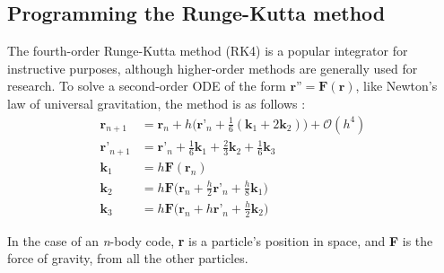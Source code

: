 \documentclass{article}
\begin{document}
\subsection{Programming the Runge-Kutta method}

The fourth-order Runge-Kutta method (RK4) is a popular integrator for instructive purposes, although higher-order methods are generally used for research. To solve a second-order ODE of the form $\textbf{r''} = \textbf{F}(\textbf{r})$, like Newton's law of universal gravitation, the method is as follows \cite{olver1965handbook}:
\begin{align}
  \textbf{r}_{n+1} &= \textbf{r}_n + h\bigg(\textbf{r'}_n + \frac{1}{6}(\textbf{k}_1 + 2\textbf{k}_2)\bigg) + \mathcal{O}(h^4) \\
  \textbf{r'}_{n+1} &= \textbf{r'}_n + \frac{1}{6}\textbf{k}_1 + \frac{2}{3}\textbf{k}_2 + \frac{1}{6}\textbf{k}_3 \\
  \textbf{k}_1 &= h\textbf{F}(\textbf{r}_n) \\
  \textbf{k}_2 &= h\textbf{F}\bigg(\textbf{r}_n + \frac{h}{2}\textbf{r'}_n + \frac{h}{8}\textbf{k}_1\bigg) \\
  \textbf{k}_3 &= h\textbf{F}\bigg(\textbf{r}_n + h\textbf{r'}_n + \frac{h}{2}\textbf{k}_2\bigg)
\end{align}

In the case of an \textit{n}-body code, \textbf{r} is a particle's position in space, and \textbf{F} is the force of gravity, from all the other particles.
\end{document}
